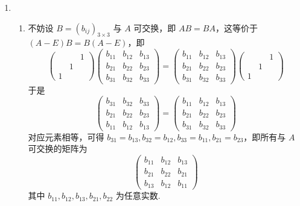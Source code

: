 \begin{enumerate}
    \item \begin{enumerate}
              \item 不妨设 $ B = (b_{ij})_{3 \times 3} $ 与 $ A $ 可交换，即 $ AB = BA $，这等价于 $ (A - E)B = B(A - E) $，即
                    \[ \begin{pmatrix}
                              &   & 1 \\
                              & 1 &   \\
                            1 &   &
                        \end{pmatrix}
                        \begin{pmatrix}
                            b_{11} & b_{12} & b_{13} \\
                            b_{21} & b_{22} & b_{23} \\
                            b_{31} & b_{32} & b_{33}
                        \end{pmatrix} =
                        \begin{pmatrix}
                            b_{11} & b_{12} & b_{13} \\
                            b_{21} & b_{22} & b_{23} \\
                            b_{31} & b_{32} & b_{33}
                        \end{pmatrix}
                        \begin{pmatrix}
                              &   & 1 \\
                              & 1 &   \\
                            1 &   &
                        \end{pmatrix} \]
                    于是
                    \[ \begin{pmatrix}
                            b_{31} & b_{32} & b_{33} \\
                            b_{21} & b_{22} & b_{23} \\
                            b_{11} & b_{12} & b_{13}
                        \end{pmatrix} = \begin{pmatrix}
                            b_{11} & b_{12} & b_{13} \\
                            b_{21} & b_{22} & b_{23} \\
                            b_{31} & b_{32} & b_{33}
                        \end{pmatrix} \]
                    对应元素相等，可得 $ b_{31} = b_{13}, b_{32} = b_{12}, b_{33} = b_{11}, b_{21} = b_{23} $，即所有与 $ A $ 可交换的矩阵为
                    \[ \begin{pmatrix}
                            b_{11} & b_{12} & b_{13} \\
                            b_{21} & b_{22} & b_{21} \\
                            b_{13} & b_{12} & b_{11}
                        \end{pmatrix} \]
                    其中 $ b_{11}, b_{12}, b_{13}, b_{21}, b_{22} $ 为任意实数.


\end{enumerate}
\end{enumerate}
